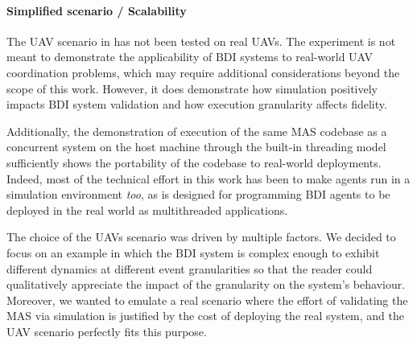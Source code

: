 

\paragraph{Simplified scenario / Scalability}

The UAV scenario in  has not been tested on real \acp{UAV}.
%
The experiment is not meant to demonstrate the applicability of \ac{BDI} systems to real-world
\ac{UAV} coordination problems, which may require additional considerations beyond the scope of this work.
%
However, it does demonstrate how simulation positively impacts \ac{BDI} system validation
and how execution granularity affects fidelity.

Additionally, the demonstration of execution of the same \ac{MAS} codebase as
a concurrent system on the host machine through the \jakta{} built-in threading model
sufficiently shows the portability of the codebase to real-world deployments.
Indeed,
most of the technical effort in this work
has been to make \jakta{} agents run in a simulation environment \emph{too},
as \jakta{} is designed for programming \ac{BDI} agents to be deployed in the real world
as multithreaded applications.
%

%
The choice of the \acp{UAV} scenario was driven by multiple factors.
We decided to focus on an example
in which the \ac{BDI} system is complex enough to exhibit different dynamics at different event granularities
so that the reader could qualitatively appreciate the impact of the granularity on the system's behaviour.
%
Moreover,
we wanted to emulate a real scenario where the effort of validating the \ac{MAS} via simulation
is justified by the cost of deploying the real system,
and the \ac{UAV} scenario perfectly fits this purpose.

